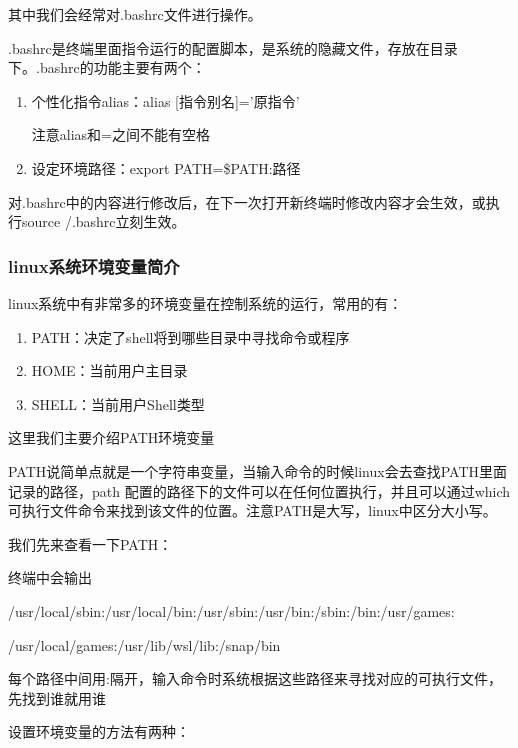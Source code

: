 其中我们会经常对.bashrc文件进行操作。

.bashrc是终端里面指令运行的配置脚本，是系统的隐藏文件，存放在\texttildelow 目录下。.bashrc的功能主要有两个：

\begin{enumerate}
\item 个性化指令alias：alias [指令别名]='原指令'

注意alias和=之间不能有空格

\item 设定环境路径：export PATH=\$PATH:路径
\end{enumerate}

对.bashrc中的内容进行修改后，在下一次打开新终端时修改内容才会生效，或执行source \texttildelow /.bashrc立刻生效。

\subsubsection{linux系统环境变量简介}

linux系统中有非常多的环境变量在控制系统的运行，常用的有：

\begin{enumerate}
\item PATH：决定了shell将到哪些目录中寻找命令或程序

\item HOME：当前用户主目录

\item SHELL：当前用户Shell类型
\end{enumerate}

这里我们主要介绍PATH环境变量

PATH说简单点就是一个字符串变量，当输入命令的时候linux会去查找PATH里面记录的路径，path 配置的路径下的文件可以在任何位置执行，并且可以通过which 可执行文件命令来找到该文件的位置。注意PATH是大写，linux中区分大小写。

我们先来查看一下PATH：


终端中会输出

/usr/local/sbin:/usr/local/bin:/usr/sbin:/usr/bin:/sbin:/bin:/usr/games:

/usr/local/games:/usr/lib/wsl/lib:/snap/bin


每个路径中间用:隔开，输入命令时系统根据这些路径来寻找对应的可执行文件，先找到谁就用谁

设置环境变量的方法有两种：

